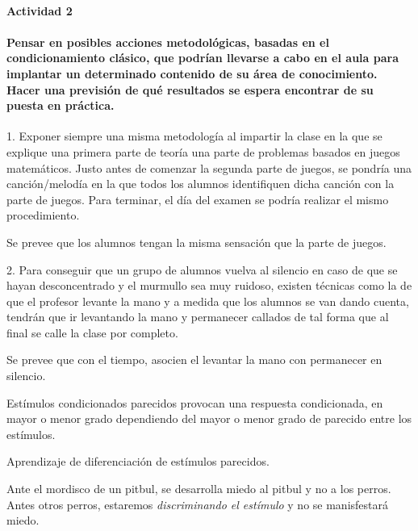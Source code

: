 \documentclass[palatino,nochap]{apuntesURJC}
\begin{document}
\begin{example}
\paragraph{Actividad 2}

\paragraph{Pensar en posibles acciones metodológicas, basadas en el condicionamiento clásico, que podrían llevarse a cabo en el aula para implantar un determinado contenido de su área de conocimiento. Hacer una previsión de qué resultados se espera encontrar de su puesta en práctica.}



1. Exponer siempre una misma metodología al impartir la clase en la que se explique una primera parte de teoría una parte de problemas basados en juegos matemáticos. Justo antes de comenzar la segunda parte de juegos, se pondría una canción/melodía en la que todos los alumnos identifiquen dicha canción con la parte de juegos.
Para terminar, el día del examen se podría realizar el mismo procedimiento. 

Se prevee que los alumnos tengan la misma sensación que la parte de juegos. 

2. Para conseguir que un grupo de alumnos vuelva al silencio en caso de que se hayan desconcentrado y el murmullo sea muy ruidoso, existen técnicas como la de que el profesor levante la mano y a medida que los alumnos se van dando cuenta, tendrán que ir levantando la mano y permanecer callados de tal forma que al final se calle la clase por completo.

Se prevee que con el tiempo, asocien el levantar la mano con permanecer en silencio.

\end{example}


\begin{defn}[Generalización] 
Estímulos condicionados parecidos provocan una respuesta condicionada, en mayor o menor grado dependiendo del mayor o menor grado de parecido entre los estímulos.
\end{defn}

\begin{defn}[Discriminación]
Aprendizaje de diferenciación de estímulos parecidos. 
\end{defn}

\begin{example}
Ante el mordisco de un pitbul, se desarrolla miedo al pitbul y no a los perros.  
%
Antes otros perros, estaremos \textit{discriminando el estímulo} y no se manisfestará miedo.
\end{example}
\end{document}
